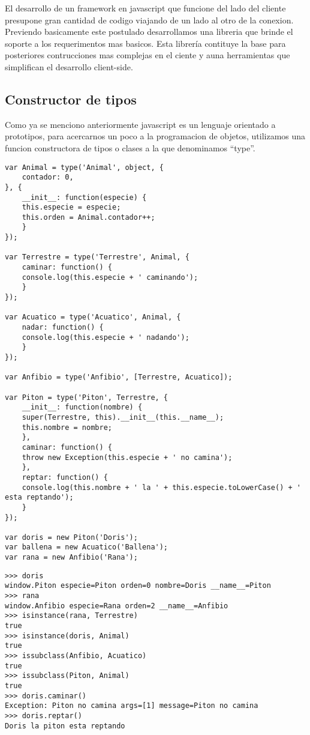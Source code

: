 El desarrollo de un framework en javascript que funcione del lado del cliente presupone gran cantidad de codigo
viajando de un lado al otro de la conexion. Previendo basicamente este postulado desarrollamos una libreria
que brinde el soporte a los requerimentos mas basicos.
Esta librería contituye la base para posteriores contrucciones mas complejas en el ciente y auna herramientas
que simplifican el desarrollo client-side.

\subsection*{Constructor de tipos}
Como ya se menciono anteriormente javascript es un lenguaje orientado a prototipos, para acercarnos un poco a la programacion
de objetos, utilizamos una funcion constructora de tipos o clases a la que denominamos “type”.
\begin{lstlisting}[style=javascript,label=definicion-de-tipos,caption=Definicion de tipos]
var Animal = type('Animal', object, {
    contador: 0,
}, {
    __init__: function(especie) {
	this.especie = especie;
	this.orden = Animal.contador++;
    }
});

var Terrestre = type('Terrestre', Animal, {
    caminar: function() {
	console.log(this.especie + ' caminando');
    }
});

var Acuatico = type('Acuatico', Animal, {
    nadar: function() {
	console.log(this.especie + ' nadando');
    }
});

var Anfibio = type('Anfibio', [Terrestre, Acuatico]);

var Piton = type('Piton', Terrestre, {
    __init__: function(nombre) {
	super(Terrestre, this).__init__(this.__name__);
	this.nombre = nombre;
    },
    caminar: function() {
	throw new Exception(this.especie + ' no camina');
    },
    reptar: function() {
	console.log(this.nombre + ' la ' + this.especie.toLowerCase() + ' esta reptando');
    }
});

var doris = new Piton('Doris');
var ballena = new Acuatico('Ballena');
var rana = new Anfibio('Rana');
\end{lstlisting}

\begin{lstlisting}[style=consola,label=definicion-de-tipos-test,caption=Test]
>>> doris
window.Piton especie=Piton orden=0 nombre=Doris __name__=Piton
>>> rana
window.Anfibio especie=Rana orden=2 __name__=Anfibio
>>> isinstance(rana, Terrestre)
true
>>> isinstance(doris, Animal)
true
>>> issubclass(Anfibio, Acuatico)
true
>>> issubclass(Piton, Animal)
true
>>> doris.caminar()
Exception: Piton no camina args=[1] message=Piton no camina
>>> doris.reptar()
Doris la piton esta reptando
\end{lstlisting}

